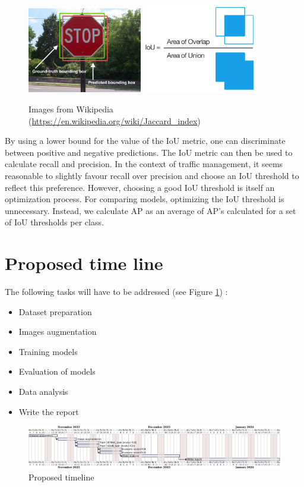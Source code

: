 \documentclass[]{article}
\begin{document}
	\begin{figure}[h]
		\centering
		\includegraphics[width=5cm]{Intersection_over_Union_-_object_detection_bounding_boxes.jpg}
		\includegraphics[width=5cm]{Intersection_over_Union_-_visual_equation.png}
		\caption{Images from Wikipedia \footnotesize{(\url{https://en.wikipedia.org/wiki/Jaccard_index})}}
	\end{figure}
	
	By using a lower bound for the value of the IoU metric, one can discriminate between positive and negative predictions. The IoU metric can then be used to calculate recall and precision. In the context of traffic management, it seems reasonable to slightly favour recall over precision and choose an IoU threshold to reflect this preference. However, choosing a good IoU threshold is itself an optimization process. For comparing models, optimizing the IoU threshold is unnecessary. Instead, we calculate AP as an average of AP's calculated for a set of IoU thresholds per class.

\section{Proposed time line}

The following tasks will have to be addressed (see Figure \ref{fig:timeline}) :
\begin{itemize}
	\item Dataset preparation
	\item Images augmentation
	\item Training models
	\item Evaluation of models
	\item Data analysis
	\item Write the report
\end{itemize}

\begin{figure}[H]
	\centering
	\includegraphics[width=\textwidth]{proposal-timing}
	\caption{Proposed timeline}
	\label{fig:timeline}
\end{figure}

\printbibliography
\end{document}
